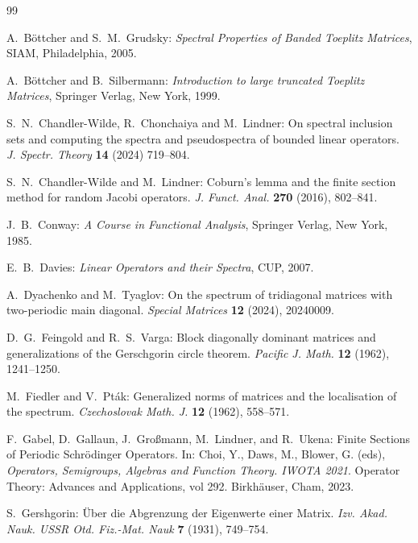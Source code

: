 \documentclass[preprint,1p,11pt]{elsarticle}
\numberwithin{equation}{section}   %
\numberwithin{figure}{section}  %
\begin{document}
\vspace{-2ex}

\begin{thebibliography}{99}

{\sc A.~B\"ottcher} and {\sc S.~M.~Grudsky:}
{\it Spectral Properties of Banded Toeplitz Matrices},
SIAM, Philadelphia, 2005.

{\sc A.~B\"ottcher} and {\sc B.~Silbermann:}
{\it Introduction to large truncated Toeplitz Matrices},
Springer Verlag, New York, 1999.

{\sc S.~N.~Chandler-Wilde, R.~Chonchaiya} and {\sc M.~Lindner:}
On spectral inclusion sets and computing the spectra and pseudospectra of bounded linear operators.
{\it J. Spectr. Theory} {\bf 14} (2024) 719--804.

{\sc S.~N.~Chandler-Wilde} and {\sc M.~Lindner:}
Coburn's  lemma and the finite section method for random Jacobi operators.
{\it J. Funct. Anal.} {\bf 270} (2016), 802--841.

{\sc J.~B.~Conway}: {\it A Course in Functional Analysis}, Springer Verlag, New York, 1985. 

{\sc E.~B.~Davies:}
{\it Linear Operators and their Spectra},
CUP,
2007.


{\sc A.~Dyachenko} and {\sc M.~Tyaglov}:
On the spectrum of tridiagonal matrices with two-periodic main diagonal.
{\it Special Matrices} {\bf 12} (2024), 20240009.

{\sc D.~G.~Feingold} and {\sc R.~S.~Varga:}
Block diagonally dominant matrices and generalizations of the Gerschgorin circle theorem.
{\it Pacific J. Math.} {\bf 12} (1962), 1241--1250.

{\sc M.~Fiedler} and {\sc V.~Pt\'ak:}
Generalized norms of matrices and the localisation of the spectrum.
{\it Czechoslovak Math. J.} {\bf 12} (1962), 558--571.

{\sc F.~Gabel,  D.~Gallaun, J.~Gro{\ss}mann, M.~Lindner,} and {\sc R.~Ukena:}
Finite Sections of Periodic Schr{\"o}dinger Operators. In: Choi, Y., Daws, M., Blower, G. (eds), {\it Operators, Semigroups, Algebras and Function Theory. IWOTA 2021}. Operator Theory: Advances and Applications, vol 292. 
Birkhäuser, Cham, 2023.

{\sc S.~Gershgorin}:
\"Uber die Abgrenzung der Eigenwerte einer Matrix.
 {\it Izv. Akad. Nauk. USSR Otd. Fiz.-Mat. Nauk} {\bf 7} (1931), 749--754.
 

\end{thebibliography}
\end{document}
